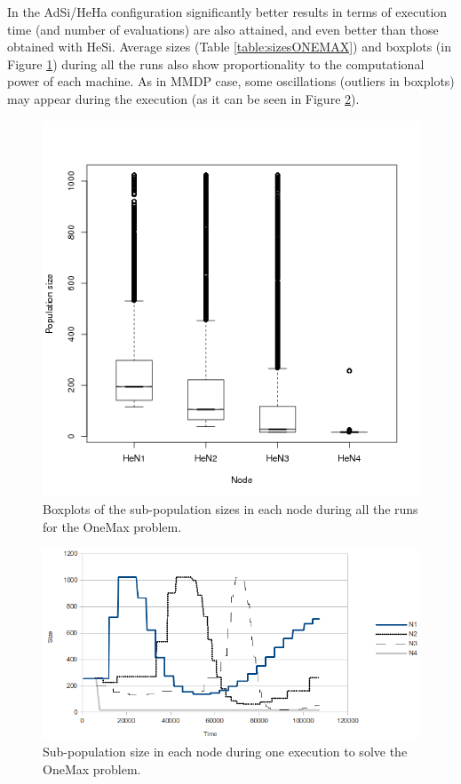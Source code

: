 In the AdSi/HeHa configuration significantly better results in terms of execution time (and number of evaluations) are also attained, and even better than those obtained with HeSi. Average sizes (Table \ref{table:sizesONEMAX}) and boxplots (in Figure \ref{fig:sizesONEMAX}) during all the runs also show proportionality to the computational power of each machine. As in MMDP case, some oscillations (outliers in boxplots) may appear during the execution (as it can be seen in Figure \ref{fig:sizesONEMAX1ejec}).

\begin{figure}
\centering
\includegraphics[scale =0.4] {gfx/adaptiveresults/sizesONEMAX.png}
\caption{Boxplots of the sub-population sizes in each node during all the runs for the OneMax problem.}
\label{fig:sizesONEMAX}
\end{figure}

\begin{figure}
\centering
\includegraphics[scale =0.4] {gfx/adaptiveresults/sizesONEMAX1ejec.png}
\caption{Sub-population size in each node during one execution to solve the OneMax problem.}
\label{fig:sizesONEMAX1ejec}
\end{figure}


